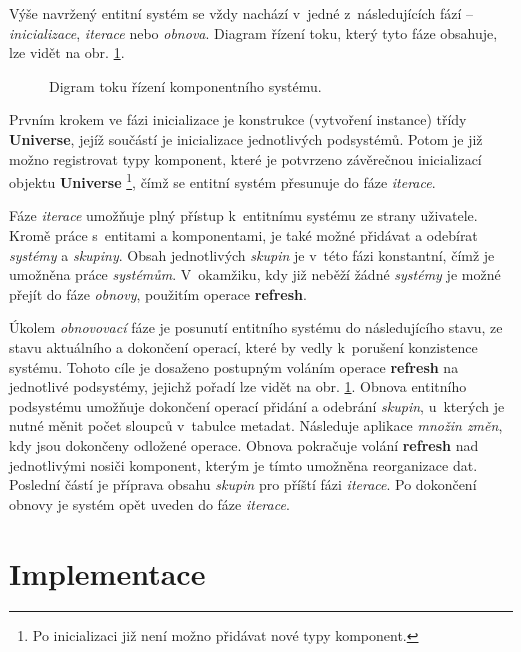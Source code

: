 Výše navržený entitní systém se vždy nachází v~jedné z~následujících fází -- \emph{inicializace}, \emph{iterace} nebo \emph{obnova}. Diagram řízení toku, který tyto fáze obsahuje, lze vidět na obr. \ref{Fig:DESFlow}.

\begin{figure}[H]
	\begin{center}
	\end{center}
	\caption{Digram toku řízení komponentního systému.}
	\label{Fig:DESFlow}
\end{figure}

Prvním krokem ve fázi inicializace je konstrukce (vytvoření instance) třídy \textbf{Universe}, jejíž součástí je inicializace jednotlivých podsystémů. Potom je již možno registrovat typy komponent, které je potvrzeno závěrečnou inicializací objektu \textbf{Universe} \footnote{Po inicializaci již není možno přidávat nové typy komponent.}, čímž se entitní systém přesunuje do fáze \emph{iterace}. 

Fáze \emph{iterace} umožňuje plný přístup k~entitnímu systému ze strany uživatele. Kromě práce s~entitami a komponentami, je také možné přidávat a odebírat \emph{systémy} a \emph{skupiny}. Obsah jednotlivých \emph{skupin} je v~této fázi konstantní, čímž je umožněna práce \emph{systémům}. V~okamžiku, kdy již neběží žádné \emph{systémy} je možné přejít do fáze \emph{obnovy}, použitím operace \textbf{refresh}.

Úkolem \emph{obnovovací} fáze je posunutí entitního systému do následujícího stavu, ze stavu aktuálního a dokončení operací, které by vedly k~porušení konzistence systému. Tohoto cíle je dosaženo postupným voláním operace \textbf{refresh} na jednotlivé podsystémy, jejichž pořadí lze vidět na obr. \ref{Fig:DESFlow}. Obnova entitního podsystému umožňuje dokončení operací přidání a odebrání \emph{skupin}, u~kterých je nutné měnit počet sloupců v~tabulce metadat. Následuje aplikace \emph{množin změn}, kdy jsou dokončeny odložené operace. Obnova pokračuje volání \textbf{refresh} nad jednotlivými nosiči komponent, kterým je tímto umožněna reorganizace dat. Poslední částí je příprava obsahu \emph{skupin} pro příští fázi \emph{iterace}. Po dokončení obnovy je systém opět uveden do fáze \emph{iterace}.

\chapter{Implementace}
\label{Chap:Implementation}

